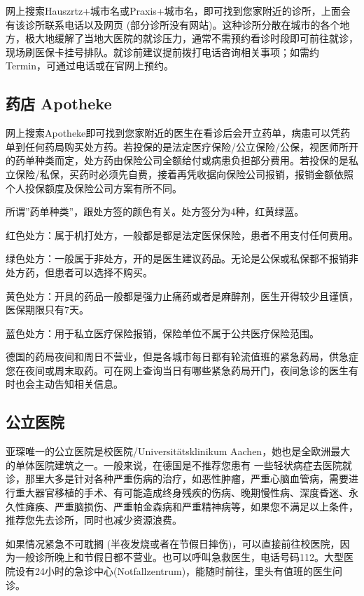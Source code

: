     网上搜索Hauszrtz+城市名或Praxis+城市名，即可找到您家附近的诊所，上面会有该诊所联系电话以及网页 (部分诊所没有网站)。这种诊所分散在城市的各个地方，极大地缓解了当地大医院的就诊压力，通常不需预约看诊时段即可前往就诊，现场刷医保卡挂号排队。就诊前建议提前拨打电话咨询相关事项；如需约Termin，可通过电话或在官网上预约。

  \subsection{药店 Apotheke}

    网上搜索Apotheke即可找到您家附近的医生在看诊后会开立药单，病患可以凭药单到任何药局购买处方药。若投保的是法定医疗保险/公立保险/公保，视医师所开的药单种类而定，处方药由保险公司全额给付或病患负担部分费用。若投保的是私立保险/私保，买药时必须先自费，接着再凭收据向保险公司报销，报销金额依照个人投保额度及保险公司方案有所不同。

    所谓”药单种类”，跟处方签的颜色有关。处方签分为4种，红黄绿蓝。

    红色处方：属于机打处方，一般都是都是法定医保保险，患者不用支付任何费用。

    绿色处方：一般属于非处方，开的是医生建议药品。无论是公保或私保都不报销非处方药，但患者可以选择不购买。

    黄色处方：开具的药品一般都是强力止痛药或者是麻醉剂，医生开得较少且谨慎，医保期限只有7天。

    蓝色处方：用于私立医疗保险报销，保险单位不属于公共医疗保险范围。

    德国的药局夜间和周日不营业，但是各城市每日都有轮流值班的紧急药局，供急症您在夜间或周末取药。可在网上查询当日有哪些紧急药局开门，夜间急诊的医生有时也会主动告知相关信息。

  \subsection{公立医院}

    亚琛唯一的公立医院是校医院/Universitätsklinikum Aachen，她也是全欧洲最大的单体医院建筑之一。一般来说，在德国是不推荐您患有 一些轻状病症去医院就诊，那里大多是针对各种严重伤病的治疗，如恶性肿瘤，严重心脑血管病，需要进行重大器官移植的手术、有可能造成终身残疾的伤病、晚期慢性病、深度昏迷、永久性瘫痪、严重脑损伤、严重帕金森病和严重精神病等，如果您不满足以上条件，推荐您先去诊所，同时也减少资源浪费。

    如果情况紧急不可耽搁 (半夜发烧或者在节假日摔伤)，可以直接前往校医院，因为一般诊所晚上和节假日都不营业。也可以呼叫急救医生，电话号码112。大型医院设有24小时的急诊中心(Notfallzentrum)，能随时前往，里头有值班的医生问诊。

